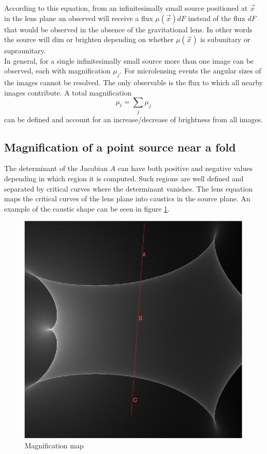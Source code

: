According to this equation, from an infinitesimally small source positioned at $\vec{x}$ in the lens plane an observed will receive a flux $\mu(\vec{x}) dF$ instead of the flux $dF$ that would be
observed in the absence of the gravitational lens. In other words the source will dim or brighten depending on whether $\mu(\vec{x})$ is subunitary or supraunitary.\\

In general, for a single infinitesimally small source more than one image can be observed, each with magnification $\mu_j$. For microlensing events the angular sizes of the
images cannot be resolved. The only observable is the flux to which all nearby images contribute. A total magnification
\begin{equation}
 \mu_t = \sum_{j} \mu_j
\end{equation}
 can be defined and account for an increase/decrease of brightness from all images.


\subsection{Magnification of a point source near a fold}

The determinant of the Jacobian $A$ can have both positive and negative values depending in which region it is computed. Such regions are well defined and separated
by critical curves where the determinant vanishes. The lens equation maps the critical curves of the lens plane into caustics in the source plane. An example of the caustic 
shape can be seen in figure \ref{fig:magnification}.\\

\begin{figure}
\centering
  \includegraphics[width=0.95\hsize]{plots/IRIS567_path_2.eps}
\caption{\label{fig:magnification} Magnification map}
\end{figure}

